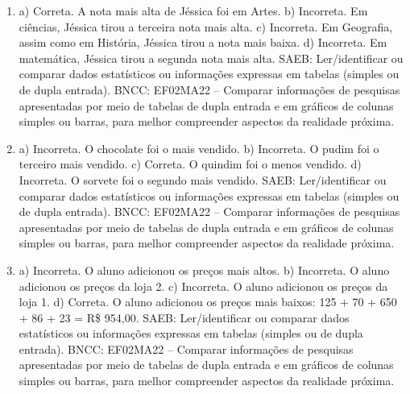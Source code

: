 \begin{enumerate}
\item
a) Correta. A nota mais alta de Jéssica foi em Artes.
b) Incorreta. Em ciências, Jéssica tirou a terceira nota mais alta.
c) Incorreta. Em Geografia, assim como em História, Jéssica tirou a nota mais baixa.
d) Incorreta. Em matemática, Jéssica tirou a segunda nota mais alta.
SAEB: Ler/identificar ou comparar dados estatísticos ou
informações expressas em tabelas (simples ou de dupla entrada).
BNCC: EF02MA22 -- Comparar informações de pesquisas apresentadas por meio
de tabelas de dupla entrada e em gráficos de colunas simples ou barras, para melhor
compreender aspectos da realidade próxima.

\item
a) Incorreta. O chocolate foi o mais vendido.
b) Incorreta. O pudim foi o terceiro mais vendido.
c) Correta. O quindim foi o menos vendido.
d) Incorreta. O sorvete foi o segundo mais vendido.
SAEB: Ler/identificar ou comparar dados estatísticos ou
informações expressas em tabelas (simples ou de dupla entrada).
BNCC: EF02MA22 -- Comparar informações de pesquisas apresentadas por meio
de tabelas de dupla entrada e em gráficos de colunas simples ou barras, para melhor
compreender aspectos da realidade próxima.

\item
a) Incorreta. O aluno adicionou os preços mais altos.
b) Incorreta. O aluno adicionou os preços da loja 2.
c) Incorreta. O aluno adicionou os preços da loja 1.
d) Correta. O aluno adicionou os preços mais baixos: 125 + 70 + 650 + 86 + 23 = R\$ 954,00.
SAEB: Ler/identificar ou comparar dados estatísticos ou
informações expressas em tabelas (simples ou de dupla entrada).
BNCC: EF02MA22 -- Comparar informações de pesquisas apresentadas por meio
de tabelas de dupla entrada e em gráficos de colunas simples ou barras, para melhor
compreender aspectos da realidade próxima.
\end{enumerate}


